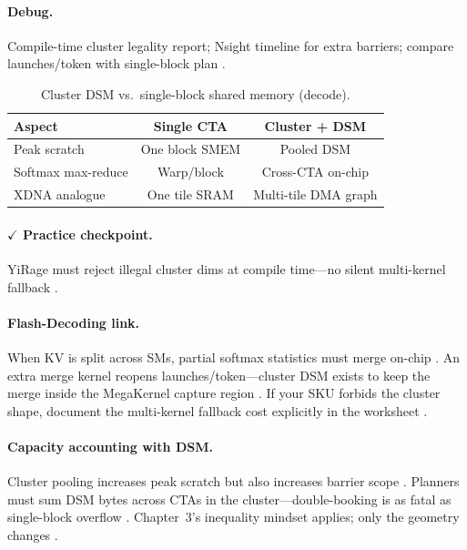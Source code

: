 \paragraph{Debug.}
Compile-time cluster legality report; Nsight timeline for extra barriers; compare launches/token with single-block plan \citep{yirage2026,patel2025llminference}.

\begin{table}[t]
\centering
\caption{Cluster DSM vs.\ single-block shared memory (decode).}
\label{tab:cluster_dsm}
\begin{tabular}{lcc}
\toprule
\textbf{Aspect} & \textbf{Single CTA} & \textbf{Cluster + DSM} \\
\midrule
Peak scratch & One block SMEM & Pooled DSM \\
Softmax max-reduce & Warp/block & Cross-CTA on-chip \\
XDNA analogue & One tile SRAM & Multi-tile DMA graph \\
\bottomrule
\end{tabular}
\end{table}

\paragraph{$\checkmark$ Practice checkpoint.}
YiRage must reject illegal cluster dims at compile time---no silent multi-kernel fallback \citep{yirage2026,chen2020compilerbasedhardw}.

\paragraph{Flash-Decoding link.}
When KV is split across SMs, partial softmax statistics must merge on-chip \citep{dao2023flashdecoding,dao2022flashattention}.
An extra merge kernel reopens launches/token---cluster DSM exists to keep the merge inside the MegaKernel capture region \citep{taxbreak2026,nvidia2024cudagraphs}.
If your SKU forbids the cluster shape, document the multi-kernel fallback cost explicitly in the worksheet \citep{patel2025llminference}.

\paragraph{Capacity accounting with DSM.}
Cluster pooling increases peak scratch but also increases barrier scope \citep{nvidia2022hopper,semianalysis2024tma}.
Planners must sum DSM bytes across CTAs in the cluster---double-booking is as fatal as single-block overflow \citep{yirage2026,memoryfloor2026}.
Chapter~3's inequality mindset applies; only the geometry changes \citep{chen2020compilerbasedhardw}.

